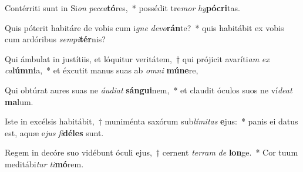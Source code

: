 \item Contérriti sunt in Si\textit{on} \textit{pec}\textit{ca}\textbf{tó}res,~* possédit tre\textit{mor} \textit{hy}\textbf{pó}\textbf{cri}tas.
\item Quis póterit habitáre de vobis cum i\textit{gne} \textit{de}\textit{vo}\textbf{rán}te?~* quis habitábit ex vobis cum ardóribus \textit{sem}\textit{pi}\textbf{tér}nis?
\item Qui ámbulat in justítiis, et lóquitur veritátem,~† qui prójicit avaríti\textit{am} \textit{ex} \textit{ca}\textbf{lúm}\textbf{ni}a,~* et éxcutit manus suas ab \textit{om}\textit{ni} \textbf{mú}\textbf{ne}re,
\item Qui obtúrat aures suas ne \textit{áu}\textit{di}\textit{at} \textbf{sán}\textbf{gui}nem,~* et claudit óculos suos ne ví\textit{de}\textit{at} \textbf{ma}lum.
\item Iste in excélsis habitábit,~† muniménta saxórum sub\textit{lí}\textit{mi}\textit{tas} \textbf{e}jus:~* panis ei datus est, aquæ e\textit{jus} \textit{fi}\textbf{dé}\textbf{les} sunt.
\item Regem in decóre suo vidébunt óculi ejus,~† cernent \textit{ter}\textit{ram} \textit{de} \textbf{lon}ge.~* Cor tuum meditábi\textit{tur} \textit{ti}\textbf{mó}rem.
